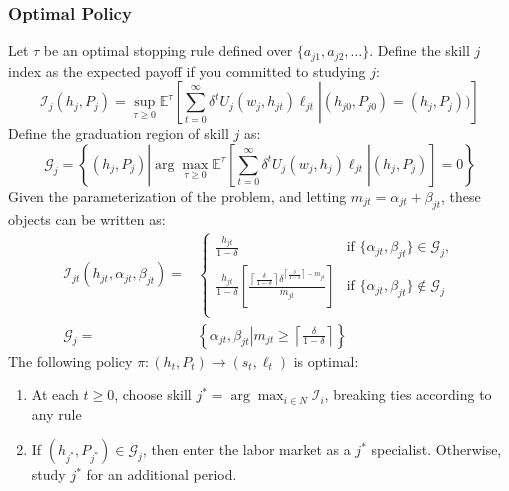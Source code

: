 \documentclass[10 pt]{article}
\newcommand{\gen}[1]{#1}
\newcommand{\gen}[1]{}
\newcommand{\sbr}[1]{\left[ #1 \right]}
\newcommand{\ce}[2]{\left[\left. #1 \right\vert #2 \right]}
\begin{document}
\subsubsection{Optimal Policy}

Let $\tau$ be an optimal stopping rule defined over $\{ a_{j1}, a_{j2}, \dots \}$. 
Define the skill $j$ index as the expected payoff if you committed to studying $j$:
\begin{equation*}
\mathcal{I}_j (h_j, P_j) = \sup_{\tau \geq 0} \mathbb{E}^\tau
\ce{
   \sum_{t=0}^\infty \delta^t U_j (w_j, h_{jt}) \ell_{jt}}
   {(h_{j0}, P_{j0}) = (h_j, P_j))
}
\end{equation*}
Define the graduation region of skill $j$ as: 
\begin{equation*}
\mathcal{G}_j = \left\{ (h_j, P_j) \left\vert
   \arg \max_{\tau \geq 0} 
   \mathbb{E}^\tau \ce{\sum_{t=0}^\infty \delta^t U_j (w_j, h_j) \ell_{jt}}
   {(h_j, P_j)} = 0
   \right. \right\}
\end{equation*}
Given the parameterization of the problem, and letting $m_{jt} = \alpha_{jt} + \beta_{jt}$, these objects can be written as: 
\begin{align*}
\mathcal{I}_{jt} (h_{jt}, \alpha_{jt}, \beta_{jt}) = &
\begin{cases}
\frac{h_{jt}}{1 - \delta} & \text{if } \{\alpha_{jt}, \beta_{jt}\} \in \mathcal{G}_{j}, \\
\frac{h_{jt}}{1 - \delta} \sbr{
   \frac{
      \left\lceil \frac{\delta}{1 - \delta} \right\rceil
      \delta^{\left\lceil \frac{\delta}{1 - \delta} \right\rceil - m_{jt}}}
   {m_{jt}}
   } & \text{if } \{\alpha_{jt}, \beta_{jt}\} \notin \mathcal{G}_{j} \\
\end{cases} \\
   \mathcal{G}_j = & \left\{ \alpha_{jt}, \beta_{jt} \left\vert m_{jt} \geq \left\lceil \frac{\delta}{1 - \delta} \right\rceil \right. \right\}
\end{align*}
The following policy $\pi: (h_t, P_t) \to (s_t, \ell_t)$ is optimal: 
\begin{enumerate}
	\item At each $t \geq 0$, choose skill $j^* = \arg \max_{i \in N} \mathcal{I}_i$, breaking ties according to any rule
	\item If $(h_{j^*}, P_{j^*}) \in \mathcal{G}_{j}$, then enter the labor market as a $j^*$ specialist. Otherwise, study $j^*$ for an additional period.  
\end{enumerate}
\end{document}
